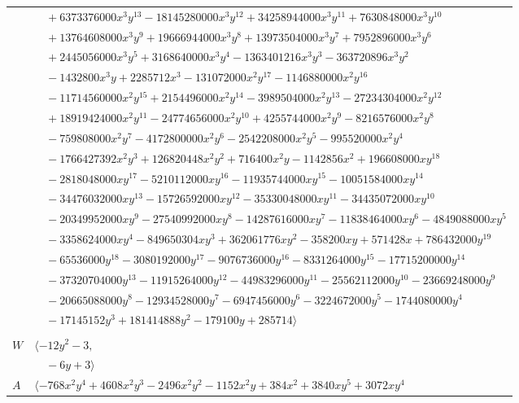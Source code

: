 \documentclass[11pt]{article}
\begin{document}
\begin{longtable}{@{}ll@{}}
 & $\quad +6373376000x^{3}y^{13}-18145280000x^{3}y^{12}+34258944000x^{3}y^{11}+7630848000x^{3}y^{10}$\\
 & $\quad +13764608000x^{3}y^{9}+19666944000x^{3}y^{8}+13973504000x^{3}y^{7}+7952896000x^{3}y^{6}$\\
 & $\quad +2445056000x^{3}y^{5}+3168640000x^{3}y^{4}-1363401216x^{3}y^{3}-363720896x^{3}y^{2}$\\
 & $\quad -1432800x^{3}y+2285712x^{3}-131072000x^{2}y^{17}-1146880000x^{2}y^{16}$\\
 & $\quad -11714560000x^{2}y^{15}+2154496000x^{2}y^{14}-3989504000x^{2}y^{13}-27234304000x^{2}y^{12}$\\
 & $\quad +18919424000x^{2}y^{11}-24774656000x^{2}y^{10}+4255744000x^{2}y^{9}-8216576000x^{2}y^{8}$\\
 & $\quad -759808000x^{2}y^{7}-4172800000x^{2}y^{6}-2542208000x^{2}y^{5}-995520000x^{2}y^{4}$\\
 & $\quad -1766427392x^{2}y^{3}+126820448x^{2}y^{2}+716400x^{2}y-1142856x^{2}+196608000xy^{18}$\\
 & $\quad -2818048000xy^{17}-5210112000xy^{16}-11935744000xy^{15}-10051584000xy^{14}$\\
 & $\quad -34476032000xy^{13}-15726592000xy^{12}-35330048000xy^{11}-34435072000xy^{10}$\\
 & $\quad -20349952000xy^{9}-27540992000xy^{8}-14287616000xy^{7}-11838464000xy^{6}-4849088000xy^{5}$\\
 & $\quad -3358624000xy^{4}-849650304xy^{3}+362061776xy^{2}-358200xy+571428x+786432000y^{19}$\\
 & $\quad -65536000y^{18}-3080192000y^{17}-9076736000y^{16}-8331264000y^{15}-17715200000y^{14}$\\
 & $\quad -37320704000y^{13}-11915264000y^{12}-44983296000y^{11}-25562112000y^{10}-23669248000y^{9}$\\
 & $\quad -20665088000y^{8}-12934528000y^{7}-6947456000y^{6}-3224672000y^{5}-1744080000y^{4}$\\
 & $\quad -17145152y^{3}+181414888y^{2}-179100y+285714\rangle$\\
\addlinespace[2pt]
\multicolumn{2}{@{}p{0.97\textwidth}@{}}{$i=45$, $D_i=4$, $\rho_{ij}$: $2{:}2, \allowbreak 4{:}1, \allowbreak 17{:}2, \allowbreak 26{:}2, \allowbreak 28{:}2, \allowbreak 39{:}1$}\\
$W$ & $\langle -12y^{2}-3,$\\
 & $\quad -6y+3\rangle$\\
$A$ & $\langle -768x^{2}y^{4}+4608x^{2}y^{3}-2496x^{2}y^{2}-1152x^{2}y+384x^{2}+3840xy^{5}+3072xy^{4}$\\

\end{longtable}
\end{document}
